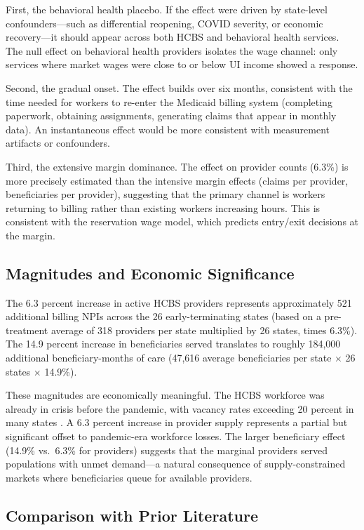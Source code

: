 \documentclass[12pt]{article}
\begin{document}
First, the behavioral health placebo. If the effect were driven by state-level confounders---such as differential reopening, COVID severity, or economic recovery---it should appear across both HCBS and behavioral health services. The null effect on behavioral health providers isolates the wage channel: only services where market wages were close to or below UI income showed a response.

Second, the gradual onset. The effect builds over six months, consistent with the time needed for workers to re-enter the Medicaid billing system (completing paperwork, obtaining assignments, generating claims that appear in monthly data). An instantaneous effect would be more consistent with measurement artifacts or confounders.

Third, the extensive margin dominance. The effect on provider counts (6.3\%) is more precisely estimated than the intensive margin effects (claims per provider, beneficiaries per provider), suggesting that the primary channel is workers returning to billing rather than existing workers increasing hours. This is consistent with the reservation wage model, which predicts entry/exit decisions at the margin.

\subsection{Magnitudes and Economic Significance}

The 6.3 percent increase in active HCBS providers represents approximately 521 additional billing NPIs across the 26 early-terminating states (based on a pre-treatment average of 318 providers per state multiplied by 26 states, times 6.3\%). The 14.9 percent increase in beneficiaries served translates to roughly 184,000 additional beneficiary-months of care (47,616 average beneficiaries per state $\times$ 26 states $\times$ 14.9\%).

These magnitudes are economically meaningful. The HCBS workforce was already in crisis before the pandemic, with vacancy rates exceeding 20 percent in many states \citep{phi2021}. A 6.3 percent increase in provider supply represents a partial but significant offset to pandemic-era workforce losses. The larger beneficiary effect (14.9\% vs.\ 6.3\% for providers) suggests that the marginal providers served populations with unmet demand---a natural consequence of supply-constrained markets where beneficiaries queue for available providers.

\subsection{Comparison with Prior Literature}
\end{document}
